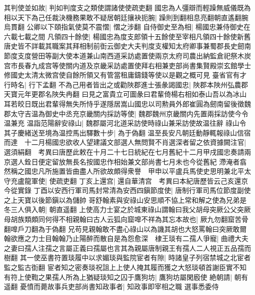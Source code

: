其判使並如故|{
	判如判度支之類使謂諸使使疏吏翻}
國忠為人彊辯而輕躁無威儀既為相以天下為己任裁決機務果敢不疑居朝廷攘袂扼腕|{
	躁則到翻相息亮翻朝直遙翻腕烏貫翻}
公卿以下頤指氣使莫不震慴|{
	慴之涉翻}
自侍御史至為相|{
	楊國忠兼侍御史在六載七載之間}
凡領四十餘使|{
	楊國忠為度支郎領十五餘使至宰相凡領四十餘使新舊唐史皆不詳載其職案其拜相制前衘云御史大夫判度支權知太府卿事兼蜀郡長史劒南節度支度營田等副大使本道兼山南西道采訪處置使兩京太府司農出納監倉祀祭木炭宫市長春九成宫等使關内道及京畿采訪處置使拜右相兼吏部尚書集賢殿崇玄館學士修國史太清太微宫使自餘所領又有管當租庸鑄錢等使以是觀之概可見}
臺省官有才行時名|{
	行下孟翻}
不為己用者皆出之或勸陜郡進士張彖謁國忠|{
	陜郡本陜州弘農郡天寶元年更郡名陜失冉翻}
曰見之富貴立可圖彖曰君輩倚楊右相如泰山吾以為冰山耳若皎日既出君輩得無失所恃乎遂隱居嵩山國忠以司勲員外郎崔圓為劒南留後徵魏郡太守吉温為御史中丞充京畿關内採訪等使|{
	魏郡魏州京畿關内先置兩採訪使今令温兼充}
温詣范陽辭安祿山|{
	魏郡屬河北道采訪使時祿山兼采訪使故温往辭}
祿山令其子慶緒送至境為温控馬出驛數十步|{
	為于偽翻}
温至長安凡朝廷動靜輒報祿山信宿而達　十二月楊國忠欲收人望建議文部選人無問賢不肖選深者留之依資據闕注官|{
	選須絹翻　考異曰唐歷此敕在十月二十七日統紀在七月舊紀十二月甲戌國忠奏請兩京選人銓日便定留放無長名按國忠作相始兼文部尚書七月未也今從舊紀}
滯淹者翕然稱之國忠凡所施置皆曲盡人所欲故頗得衆譽　甲申以平盧兵馬使史思明兼北平太守充盧龍軍使|{
	使疏吏翻}
丁亥上還宫|{
	還自華清宫　考異曰本紀唐歷皆云己亥還京今從實錄}
丁酉以安西行軍司馬封常清為安西四鎭節度使|{
	唐制行軍司馬位節度副使之上天寶以後節鎭以為儲帥}
哥舒翰素與安祿山安思順不協上常和解之使為兄弟是冬三人俱入朝|{
	朝直遥翻}
上使高力士宴之於城東祿山謂翰曰我父胡母突厥公父突厥母胡族類頗同何得不相親翰曰古人云狐向窟嘷不祥為其忘本故也|{
	厥九勿翻窟苦骨翻嘷戶刀翻為于偽翻}
兄苟見親翰敢不盡心祿山以為譏其胡也大怒罵翰曰突厥敢爾翰欲應之力士目翰翰乃止陽醉而散自是為怨愈深　棣王琰有二孺人爭寵|{
	曲禮大夫之妻曰孺人注孺之言屬正義曰孺屬也言其為親屬唐制親王有孺人二人視正五品孺而樹翻}
其一使巫書符置琰履中以求媚琰與監院宦者有隙|{
	時諸皇子列宿禁城之北宦者監之監古衘翻}
宦者知之密奏琰祝詛上上使人掩其履而獲之大怒琰頓首謝臣實不知有符上使鞫之果孺人所為上猶疑琰知之囚于鷹狗坊|{
	鷹狗坊屬閑廏使}
絶朝請|{
	朝有遥翻}
憂憤而薨故事兵吏部尚書知政事者|{
	知政事即宰相之職}
選事悉委侍

